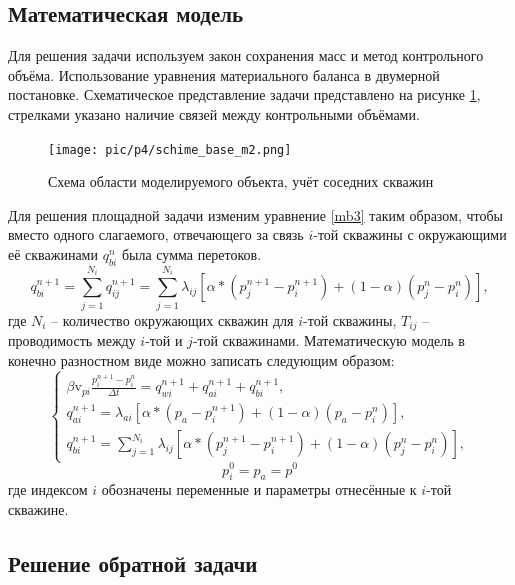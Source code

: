 \documentclass[14pt]{article}
\begin{document}
\subsection{Математическая модель}
Для решения задачи используем закон сохранения масс и метод контрольного объёма. 
Использование уравнения материального баланса в двумерной постановке.
Схематическое представление задачи представлено на рисунке \ref{fig:schime_m2}, стрелками указано наличие связей между контрольными объёмами.
\begin{figure}[!htb]
	\centering
	\texttt{[image: pic/p4/schime\_base\_m2.png]}
	\caption{Схема области моделируемого объекта, учёт соседних скважин}
	\label{fig:schime_m2}
\end{figure}
Для решения площадной задачи изменим уравнение \ref{mb3} таким образом, чтобы вместо одного слагаемого, отвечающего за связь $i$-той скважины с окружающими её скважинами $q_{bi}^{n}$ была сумма перетоков.
\begin{equation}\label{mb3_tune}
	q_{bi}^{n+1} =  \sum_{j=1}^{N_i} q_{ij}^{n+1} = \sum_{j=1}^{N_i}\lambda_{ij} \left[\alpha*\left(p_j^{n+1} - p_i^{n+1}\right) + \left(1-\alpha\right)\left(p_j^n - p_i^n\right)\right],
\end{equation}
где $N_i$ -- количество окружающих скважин для $i$-той скважины, $T_{ij}$ -- проводимость между $i$-той и $j$-той скважинами. Математическую модель в конечно разностном виде можно записать следующим образом:
\begin{equation}\label{prx_sim}
	\begin{cases}
		\beta \mathrm{v}_{pi}\frac{p_i^{n+1} - p_i^n}{\Delta t} = q_{wi}^{n+1} + q_{ai}^{n+1} + q_{bi}^{n+1},
		\\
		q_{ai}^{n+1} = \lambda_{ai} \left[\alpha*\left(p_{a} - p_i^{n+1}\right) + \left(1-\alpha\right)\left(p_a - p_i^n\right)\right],
		\\
		q_{bi}^{n+1} =  \sum_{j=1}^{N_i}\lambda_{ij} \left[\alpha*\left(p_j^{n+1} - p_i^{n+1}\right) + \left(1-\alpha\right)\left(p_j^n - p_i^n\right)\right],
	\end{cases}
\end{equation}
\begin{equation}\label{prx_sim_gy_ny}
	p_i^0 = p_a = p^0
\end{equation}	
где индексом $i$ обозначены переменные и параметры отнесённые к $i$-той скважине.

\subsection{Решение обратной задачи} 
\end{document}
